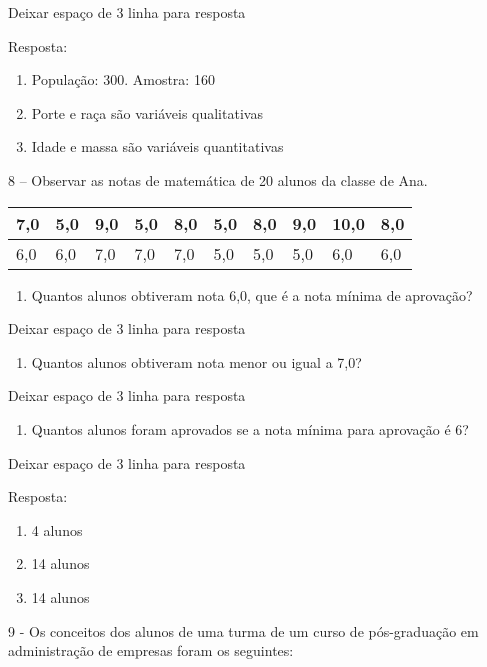 Deixar espaço de 3 linha para resposta

Resposta:

\begin{enumerate}
\def\labelenumi{\alph{enumi})}
\item
  População: 300. Amostra: 160
\item
  Porte e raça são variáveis qualitativas
\item
  Idade e massa são variáveis quantitativas
\end{enumerate}

8 -- Observar as notas de matemática de 20 alunos da classe de Ana.

\begin{longtable}[]{@{}llllllllll@{}}
\toprule
7,0 & 5,0 & 9,0 & 5,0 & 8,0 & 5,0 & 8,0 & 9,0 & 10,0 &
8,0\tabularnewline
\midrule
\endhead
6,0 & 6,0 & 7,0 & 7,0 & 7,0 & 5,0 & 5,0 & 5,0 & 6,0 & 6,0\tabularnewline
\bottomrule
\end{longtable}

\begin{enumerate}
\def\labelenumi{\alph{enumi})}
\item
  Quantos alunos obtiveram nota 6,0, que é a nota mínima de aprovação?
\end{enumerate}

Deixar espaço de 3 linha para resposta

\begin{enumerate}
\def\labelenumi{\alph{enumi})}
\item
  Quantos alunos obtiveram nota menor ou igual a 7,0?
\end{enumerate}

Deixar espaço de 3 linha para resposta

\begin{enumerate}
\def\labelenumi{\alph{enumi})}
\item
  Quantos alunos foram aprovados se a nota mínima para aprovação é 6?
\end{enumerate}

Deixar espaço de 3 linha para resposta

Resposta:

\begin{enumerate}
\def\labelenumi{\alph{enumi})}
\item
  4 alunos
\item
  14 alunos
\item
  14 alunos
\end{enumerate}

9 - Os conceitos dos alunos de uma turma de um curso de pós-graduação em
administração de empresas foram os seguintes:

